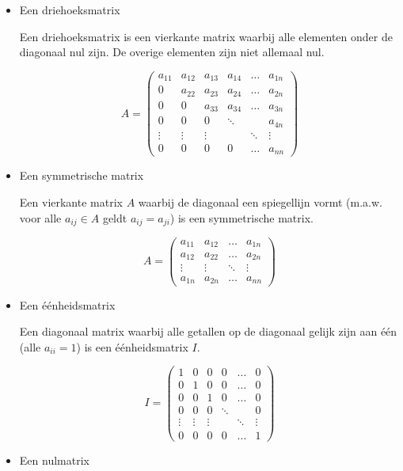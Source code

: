\begin{itemize}
\item{Een driehoeksmatrix}

Een driehoeksmatrix is een vierkante matrix waarbij alle elementen onder de diagonaal nul zijn. De overige elementen zijn niet allemaal nul.

\[
A= \left( \begin{matrix}
a_{11} & a_{12} & a_{13} & a_{14} & \ldots & a_{1n} \\
0  & a_{22} & a_{23} & a_{24} & \ldots & a_{2n} \\
0 & 0 & a_{33} & a_{34} & \ldots & a_{3n} \\
0 & 0 & 0 & \ddots &  & a_{4n} \\
\vdots & \vdots & \vdots &  & \ddots & \vdots \\
0 & 0 & 0 & 0 & \ldots & a_{nn}
\end{matrix} \right)
\]

\item{Een symmetrische matrix}

Een vierkante matrix $A$ waarbij de diagonaal een spiegellijn vormt (m.a.w. voor alle $a_{ij} \in A$ geldt $a_{ij}=a_{ji}$) is een symmetrische matrix.

\[
A= \left( \begin{matrix}
a_{11} & a_{12} & \ldots & a_{1n} \\
a_{12} & a_{22} & \ldots & a_{2n} \\
\vdots & \vdots & \ddots & \vdots \\
a_{1n} & a_{2n} & \ldots & a_{nn}
\end{matrix} \right)
\]

\item{Een \'{e}\'{e}nheidsmatrix}

Een diagonaal matrix waarbij alle getallen op de diagonaal gelijk zijn aan \'{e}\'{e}n (alle $a_{ii}=1$) is een \'{e}\'{e}nheidsmatrix $I$.

\[
I= \left( \begin{matrix}
1 & 0 & 0 & 0 & \ldots & 0 \\
0 & 1 & 0 & 0 & \ldots & 0 \\
0 & 0 & 1 & 0 & \ldots & 0 \\
0 & 0 & 0 & \ddots &  & 0 \\
\vdots & \vdots & \vdots &  & \ddots & \vdots \\
0 & 0 & 0 & 0 & \ldots & 1
\end{matrix} \right)
\]

\item{Een nulmatrix}


\end{itemize}
